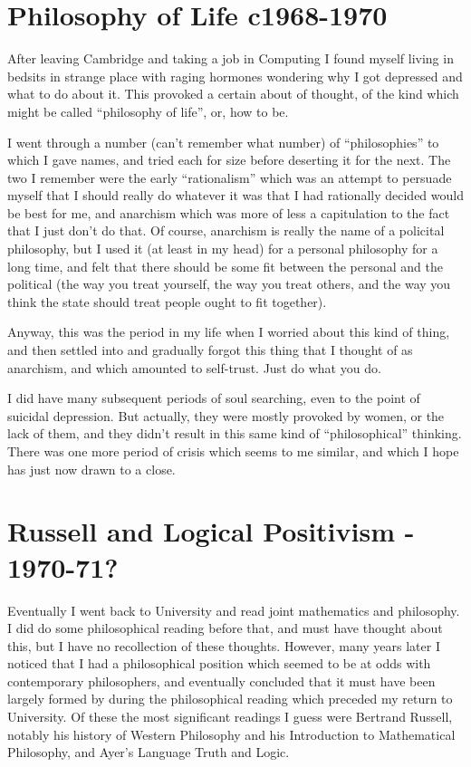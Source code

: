 \documentclass[10pt,titlepage]{book}
\begin{document}
\section{Philosophy of Life c1968-1970}

After leaving Cambridge and taking a job in Computing I found myself living in bedsits in strange place with raging hormones wondering why I got depressed and what to do about it.
This provoked a certain about of thought, of the kind which might be called ``philosophy of life'', or, how to be.

I went through a number (can't remember what number) of ``philosophies'' to which I gave names, and tried each for size before deserting it for the next.
The two I remember were the early ``rationalism'' which was an attempt to persuade myself that I should really do whatever it was that I had rationally decided would be best for me, and anarchism which was more of less a capitulation to the fact that I just don't do that.
Of course, anarchism is really the name of a policital philosophy, but I used it (at least in my head) for a personal philosophy for a long time, and felt that there should be some fit between the personal and the political (the way you treat yourself, the way you treat others, and the way you think the state should treat people ought to fit together).

Anyway, this was the period in my life when I worried about this kind of thing, and then settled into and gradually forgot this thing that I thought of as anarchism, and which amounted to self-trust.
Just do what you do.

I did have many subsequent periods of soul searching, even to the point of suicidal depression.
But actually, they were mostly provoked by women, or the lack of them, and they didn't result in this same kind of ``philosophical'' thinking.
There was one more period of crisis which seems to me similar, and which I hope has just now drawn to a close.

\section{Russell and Logical Positivism - 1970-71?}

Eventually I went back to University and read joint mathematics and philosophy.
I did do some philosophical reading before that, and must have thought about this, but I have no recollection of these thoughts.
However, many years later I noticed that I had a philosophical position which seemed to be at odds with contemporary philosophers, and eventually concluded that it must have been largely formed by during the philosophical reading which preceded my return to University.
Of these the most significant readings I guess were Bertrand Russell, notably his history of Western Philosophy and his Introduction to Mathematical Philosophy, and Ayer's Language Truth and Logic.
\end{document}
